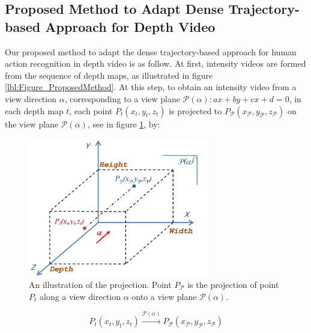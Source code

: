 \documentclass[review]{elsarticle}
\begin{document}
\subsection{Proposed Method to Adapt Dense Trajectory-based Approach for Depth Video}

Our proposed method to adapt the dense trajectory-based approach for human action recognition in depth video is as follow. At first, intensity videos are formed from the sequence of depth maps, as illustrated in figure \ref{lbl:Figure_ProposedMethod}. At this step, to obtain an intensity video from a view direction $\alpha$, corresponding to a view plane $\mathcal{P}(\alpha): ax + by + cx + d = 0$, in each depth map $t$, each point $P_t(x_t,y_t,z_t)$ is projected to $P_\mathcal{P}(x_\mathcal{P},y_\mathcal{P},z_\mathcal{P})$ on the view plane $\mathcal{P}(\alpha)$, see in figure \ref{lbl:Figure_PointProjection}, by:

\begin{figure}
	\centering
		\includegraphics[width=0.7\textwidth]{Figure_PointProjection.pdf} %
	\caption{\label{lbl:Figure_PointProjection}An illustration of the projection. Point $P_\mathcal{P}$ is the projection of point $P_t$ along a view direction $\alpha$ onto a view plane $\mathcal{P}(\alpha)$.}
\end{figure}

\begin{equation}
	P_t(x_t,y_t,z_t)\xrightarrow{\mathcal{P}(\alpha)}P_\mathcal{P}(x_\mathcal{P},y_\mathcal{P},z_\mathcal{P})
\end{equation}
\end{document}

